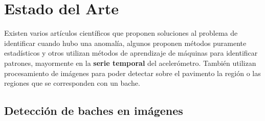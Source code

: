 \chapter{Estado del Arte}\label{chapter:state-of-the-art}

Existen varios artículos científicos que proponen soluciones al problema de identificar cuando hubo una anomalía, algunos proponen métodos
puramente estadísticos y otros utilizan métodos de aprendizaje de máquinas para identificar patrones, mayormente en la \textbf{serie temporal} del
acelerómetro. También utilizan procesamiento de imágenes para poder detectar sobre el pavimento la región o las regiones que se corresponden
con un bache.

\section{Detección de baches en imágenes}

